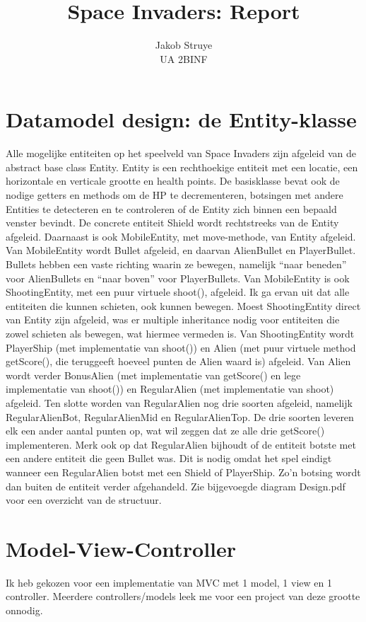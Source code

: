 \documentclass[11pt, a4paper]{article}
\begin{document}
\title{Space Invaders: Report}
\author{Jakob Struye\\ UA 2BINF}
\date{}
\maketitle

\section{Datamodel design: de Entity-klasse}
Alle mogelijke entiteiten op het speelveld van Space Invaders zijn afgeleid van de abstract base class Entity. Entity is een rechthoekige entiteit met een locatie, een horizontale en verticale grootte en health points. De basisklasse bevat ook de nodige getters en methods om de HP te decrementeren, botsingen met andere Entities te detecteren en te controleren of de Entity zich binnen een bepaald venster bevindt. De concrete entiteit Shield wordt rechtstreeks van de Entity afgeleid. Daarnaast is ook MobileEntity, met move-methode, van Entity afgeleid. Van MobileEntity wordt Bullet afgeleid, en daarvan AlienBullet en PlayerBullet. Bullets hebben een vaste richting waarin ze bewegen, namelijk “naar beneden” voor AlienBullets en “naar boven” voor PlayerBullets. Van MobileEntity is ook ShootingEntity, met een puur virtuele shoot(), afgeleid. Ik ga ervan uit dat alle entiteiten die kunnen schieten, ook kunnen bewegen. Moest ShootingEntity direct van Entity zijn afgeleid, was er multiple inheritance nodig voor entiteiten die zowel schieten als bewegen, wat hiermee vermeden is. Van ShootingEntity wordt PlayerShip (met implementatie van shoot()) en Alien (met puur virtuele method getScore(), die teruggeeft hoeveel punten de Alien waard is) afgeleid. Van Alien wordt verder BonusAlien (met implementatie van getScore() en lege implementatie van shoot()) en RegularAlien (met implementatie van shoot) afgeleid. Ten slotte worden van RegularAlien nog drie soorten afgeleid, namelijk RegularAlienBot, RegularAlienMid en RegularAlienTop. De drie soorten leveren elk een ander aantal punten op, wat wil zeggen dat ze alle drie getScore() implementeren. Merk ook op dat RegularAlien bijhoudt of de entiteit botste met een andere entiteit die geen Bullet was. Dit is nodig omdat het spel eindigt wanneer een RegularAlien botst met een Shield of PlayerShip. Zo'n botsing wordt dan buiten de entiteit verder afgehandeld.
Zie bijgevoegde diagram Design.pdf voor een overzicht van de structuur.

\section{Model-View-Controller}
 Ik heb gekozen voor een implementatie van MVC met 1 model, 1 view en 1 controller. Meerdere controllers/models leek me voor een project van deze grootte onnodig.
\end{document}
